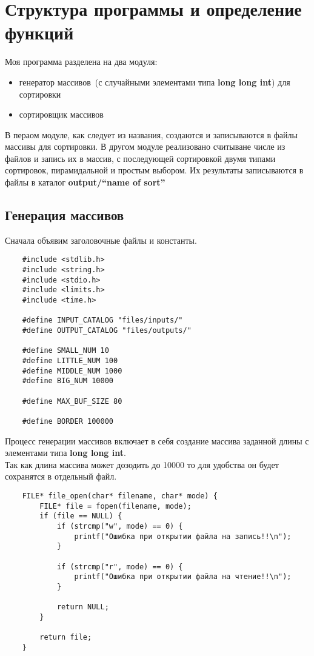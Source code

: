 \documentclass[a4paper,12pt,titlepage,finall]{article}
\begin{document}
\section{Структура программы и определение функций}

Моя программа разделена на два модуля:
\begin{itemize}
    \item генератор массивов~(с случайными элементами типа \textbf{long long int}) для сортировки
    \item сортировщик массивов
\end{itemize}

В пераом модуле, как следует из названия, создаются и записываются в файлы массивы для сортировки.
В другом модуле реализовано считыване числе из файлов и запись их в массив, с последующей сортировкой
двумя типами сортировок, пирамидальной и простым выбором. Их результаты записываются в файлы
в каталог \textbf{output/``name of sort''}

\subsection{Генерация массивов}

Сначала объявим заголовочные файлы и константы.
\begin{verbatim}
    #include <stdlib.h>
    #include <string.h>
    #include <stdio.h>
    #include <limits.h>
    #include <time.h>
    
    #define INPUT_CATALOG "files/inputs/"
    #define OUTPUT_CATALOG "files/outputs/"
    
    #define SMALL_NUM 10
    #define LITTLE_NUM 100
    #define MIDDLE_NUM 1000
    #define BIG_NUM 10000
    
    #define MAX_BUF_SIZE 80
    
    #define BORDER 100000
\end{verbatim}

Процесс генерации массивов включает в себя создание массива заданной длины с элементами типа \textbf{long long int}. \\
Так как длина массива может дозодить до 10000 то для удобства он будет сохранятся в отдельный файл.

\begin{verbatim}
    FILE* file_open(char* filename, char* mode) {
        FILE* file = fopen(filename, mode);
        if (file == NULL) {
            if (strcmp("w", mode) == 0) {
                printf("Ошибка при открытии файла на запись!!\n");
            }

            if (strcmp("r", mode) == 0) {
                printf("Ошибка при открытии файла на чтение!!\n");
            }

            return NULL;
        }

        return file;
    }
\end{verbatim}
\end{document}
